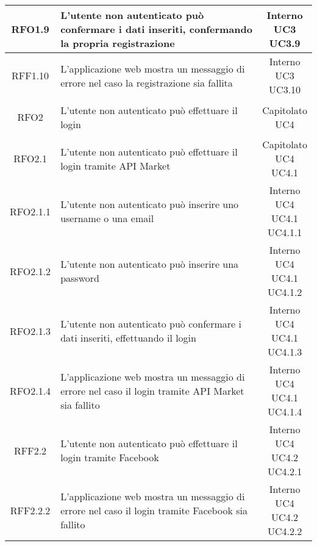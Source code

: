 \begin{longtable}{|c|p{8cm}|c|}
\hline
\hypertarget{RFO1.9}{RFO1.9} & L'utente non autenticato può confermare i dati inseriti, confermando la propria registrazione & \makecell*{Interno\\UC3\\UC3.9} \\
\hline
\hypertarget{RFF1.10}{RFF1.10} & L'applicazione web mostra un messaggio di errore nel caso la registrazione sia fallita & \makecell*{Interno\\UC3\\UC3.10} \\
\hline

\hypertarget{RFO2}{RFO2} & L'utente non autenticato può effettuare il login & \makecell*{Capitolato\\UC4} \\
\hline

\hypertarget{RFO2.1}{RFO2.1} & L'utente non autenticato può effettuare il login tramite API Market & \makecell*{Capitolato\\UC4\\UC4.1} \\
\hline

\hypertarget{RFO2.1.1}{RFO2.1.1} & L'utente non autenticato può inserire uno username o una email & \makecell*{Interno\\UC4\\UC4.1\\UC4.1.1} \\
\hline
\hypertarget{RFO2.1.2}{RFO2.1.2} & L'utente non autenticato può inserire una password & \makecell*{Interno\\UC4\\UC4.1\\UC4.1.2} \\
\hline
\hypertarget{RFO2.1.3}{RFO2.1.3} & L'utente non autenticato può confermare i dati inseriti, effettuando il login & \makecell*{Interno\\UC4\\UC4.1\\UC4.1.3} \\
\hline
\hypertarget{RFO2.1.4}{RFO2.1.4} & L'applicazione web mostra un messaggio di errore nel caso il login tramite API Market sia fallito & \makecell*{Interno\\UC4\\UC4.1\\UC4.1.4} \\
\hline

\hypertarget{RFF2.2}{RFF2.2} & L'utente non autenticato può effettuare il login tramite Facebook & \makecell*{Interno\\UC4\\UC4.2\\UC4.2.1} \\
\hline
\hypertarget{RFF2.2.2}{RFF2.2.2} & L'applicazione web mostra un messaggio di errore nel caso il login tramite Facebook sia fallito & \makecell*{Interno\\UC4\\UC4.2\\UC4.2.2} \\
\hline


\end{longtable}
